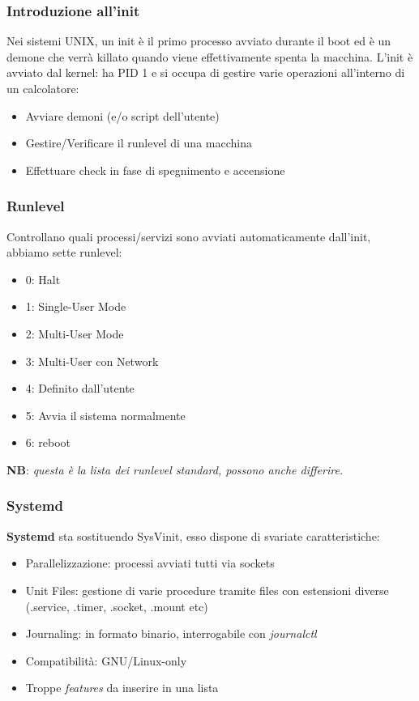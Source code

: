 \documentclass{beamer}
\begin{document}
\begin{frame}
\frametitle{Introduzione all'init}
Nei sistemi UNIX, un init \`e il primo processo avviato durante il boot ed \`e un demone che verr\`a killato quando viene effettivamente spenta la macchina. L'init \`e avviato dal kernel: ha PID 1 e si occupa di gestire varie operazioni all'interno di un calcolatore:
\begin{itemize}
	\item Avviare demoni (e/o script dell'utente)
	\item Gestire/Verificare il runlevel di una macchina
	\item Effettuare check in fase di spegnimento e accensione
\end{itemize}
\end{frame}


\begin{frame}
\frametitle{Runlevel}
Controllano quali processi/servizi sono avviati automaticamente dall'init, abbiamo sette runlevel:
\begin{itemize}
	\item 0: Halt
	\item 1: Single-User Mode
	\item 2: Multi-User Mode
	\item 3: Multi-User con Network
	\item 4: Definito dall'utente
	\item 5: Avvia il sistema normalmente
	\item 6: reboot
\end{itemize}

\textbf{NB}: \textit{questa \`e la lista dei runlevel standard, possono anche differire.}
\end{frame}


\begin{frame}
\frametitle{Systemd}
\textbf{Systemd} sta sostituendo SysVinit, esso dispone di svariate caratteristiche:
\begin{itemize}
	\item Parallelizzazione: processi avviati tutti via sockets
	\item Unit Files: gestione di varie procedure tramite files con estensioni diverse (.service, .timer, .socket, .mount etc)
	\item Journaling: in formato binario, interrogabile con \textit{journalctl}
	\item Compatibilit\`a: GNU/Linux-only
	\item Troppe \textit{features} da inserire in una lista
\end{itemize}
\end{frame}
\end{document}
